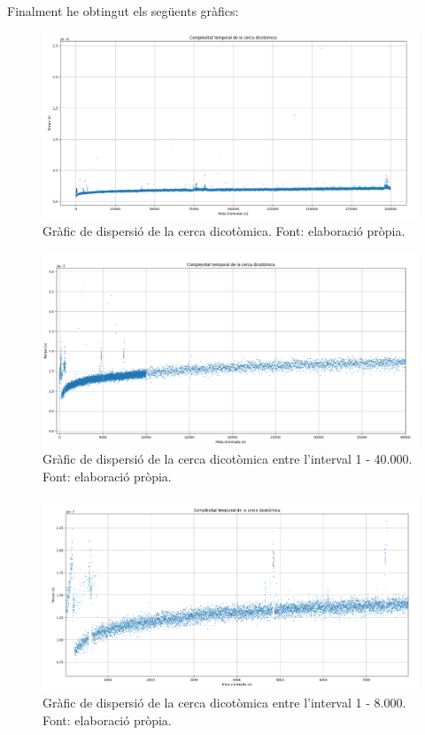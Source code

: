Finalment he obtingut els següents gràfics:
\begin{figure}[H]
    \centering
    \includegraphics[width=1\textwidth]{capitols/figures/dicotomicagrafic.png}
    \caption[Gràfic de dispersió de la cerca dicotòmica.]{Gràfic de dispersió de la cerca dicotòmica. Font: elaboració pròpia.}
    \label{fig:my_label}
\end{figure}
\begin{figure}[H]
    \centering
    \includegraphics[width=1\textwidth]{capitols/figures/dicotomicaampliat.png}
    \caption[Gràfic de dispersió de la cerca dicotòmica entre l'interval 1 - 40.000.]{Gràfic de dispersió de la cerca dicotòmica entre l'interval 1 - 40.000. Font: elaboració pròpia.}
    \label{fig:my_label}
\end{figure}
\begin{figure}[H]
    \centering
    \includegraphics[width=1\textwidth]{capitols/figures/zoomin.png}
    \caption[Gràfic de dispersió de la cerca dicotòmica entre l'interval 1 - 8.000.]{Gràfic de dispersió de la cerca dicotòmica entre l'interval 1 - 8.000. Font: elaboració pròpia.}
    \label{fig:my_label}
\end{figure}

